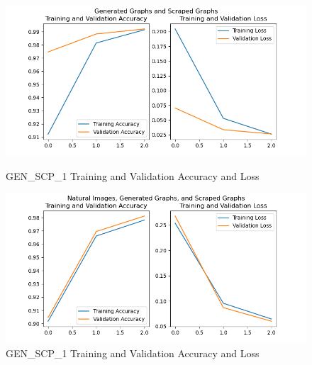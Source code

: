 \documentclass[12pt]{article}
\begin{document}
            \begin{figure}
            
                \begin{center}

                    \includegraphics[scale=0.8]{GEN_SCP_1_HIST_RESULTS.png}
                    \caption{GEN\_SCP\_1 Training and Validation Accuracy and Loss}
                    \label{gen-scp-acc-loss}
        
                \end{center}
                
        
            
                \begin{center}

                    \includegraphics[scale=0.8]{CIFAR_GEN_SCP_1_HIST_RESULTS.png}
                    \caption{GEN\_SCP\_1 Training and Validation Accuracy and Loss}
                    \label{cifar-gen-scp-acc-loss}
        
                \end{center}
                
            \end{figure}
\end{document}
